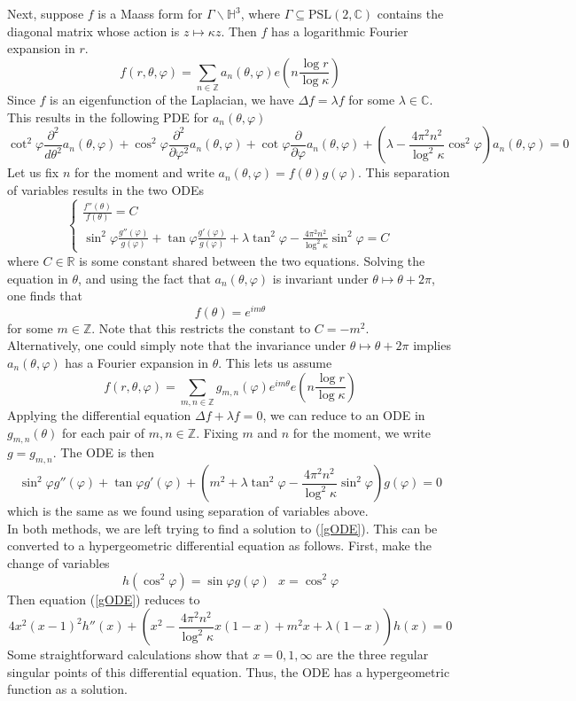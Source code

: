 \documentclass[]{article}
\begin{document}
Next, suppose $f$ is a Maass form for $\Gamma\backslash\mathbb{H}^3$, where $\Gamma \subseteq \text{PSL}(2, \mathbb{C})$ contains the diagonal matrix whose action is $z \mapsto \kappa z$.
Then $f$ has a logarithmic Fourier expansion in $r$.
$$
f(r, \theta, \varphi) =
\sum_{n \in \mathbb{Z}}a_n(\theta, \varphi)e\left(n\frac{\log r}{\log\kappa}\right)
$$
Since $f$ is an eigenfunction of the Laplacian, we have $\Delta f = \lambda f$ for some $\lambda \in \mathbb{C}$.
This results in the following PDE for $a_n(\theta, \varphi)$
$$
\cot^2\varphi\frac{\partial^2}{d\theta^2}a_n(\theta, \varphi) + \cos^2\varphi\frac{\partial^2}{\partial\varphi^2}a_n(\theta, \varphi) + \cot\varphi\frac{\partial}{\partial\varphi}a_n(\theta, \varphi) + \left( \lambda - \frac{4\pi^2n^2}{\log^2\kappa}\cos^2\varphi \right)a_n(\theta, \varphi) = 0
$$
Let us fix $n$ for the moment and write $a_n(\theta, \varphi) = f(\theta)g(\varphi)$.
This separation of variables results in the two ODEs
$$
\begin{cases}
\frac{f''(\theta)}{f(\theta)} = C \\
\sin^2\varphi\frac{g''(\varphi)}{g(\varphi)} + \tan\varphi\frac{g'(\varphi)}{g(\varphi)} + \lambda\tan^2\varphi - \frac{4\pi^2n^2}{\log^2\kappa}\sin^2\varphi = C
\end{cases}
$$
where $C \in \mathbb{R}$ is some constant shared between the two equations.
Solving the equation in $\theta$, and using the fact that $a_n(\theta, \varphi)$ is invariant under $\theta \mapsto \theta + 2\pi$, one finds that
$$
f(\theta) = e^{im\theta}
$$
for some $m \in \mathbb{Z}$.
Note that this restricts the constant to $C = -m^2$.
\\

Alternatively, one could simply note that the invariance under $\theta \mapsto \theta + 2\pi$ implies $a_n(\theta, \varphi)$ has a Fourier expansion in $\theta$.
This lets us assume
$$
f(r, \theta, \varphi) = \sum_{m, n \in \mathbb{Z}}g_{m, n}(\varphi)e^{im\theta}e\left(n\frac{\log r}{\log\kappa}\right)
$$
Applying the differential equation $\Delta f + \lambda f = 0$, we can reduce to an ODE in $g_{m, n}(\theta)$ for each pair of $m, n \in \mathbb{Z}$.
Fixing $m$ and $n$ for the moment, we write $g = g_{m,n}$.
The ODE is then
\begin{equation}\label{gODE}
\sin^2\varphi g''(\varphi) + \tan\varphi g'(\varphi) + \left(m^2 + \lambda\tan^2\varphi - \frac{4\pi^2n^2}{\log^2\kappa}\sin^2\varphi\right)g(\varphi) = 0
\end{equation}
which is the same as we found using separation of variables above.
\\

In both methods, we are left trying to find a solution to (\ref{gODE}).
This can be converted to a hypergeometric differential equation as follows.
First, make the change of variables
$$
h(\cos^2\varphi) = \sin\varphi g(\varphi) ~~~ x = \cos^2\varphi
$$
Then equation (\ref{gODE}) reduces to
$$
4x^2(x - 1)^2h''(x) + \left( x^2 - \frac{4\pi^2n^2}{\log^2\kappa}x(1 - x) + m^2x + \lambda(1 - x) \right)h(x) = 0
$$
Some straightforward calculations show that $x = 0, 1, \infty$ are the three regular singular points of this differential equation.
Thus, the ODE has a hypergeometric function as a solution.
\end{document}
